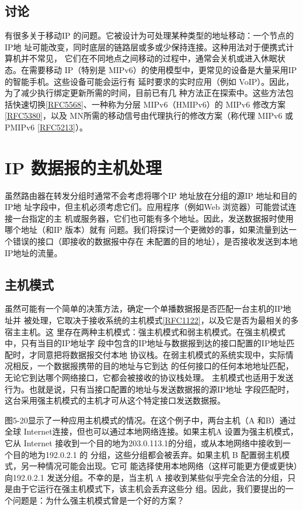 \subsection{讨论}
有很多关于移动IP 的问题。它被设计为可处理某种类型的地址移动：一个节点的IP地
址可能改变，同时底层的链路层或多或少保持连接。这种用法对于便携式计算机并不常见，
它们在不同地点之间移动的过程中，通常会关机或进入休眠状态。在需要移动 IP（特别是
MIPv6）的使用模型中，更常见的设备是大量采用IP的智能手机。这些设备可能会运行有
延时要求的实时应用（例如 VoIP）。因此，为了减少执行绑定更新所需的时间，目前已有几
种方法正在探索中。这些方法包括快速切换\href{https://www.rfc-editor.org/rfc/rfc5568}{[RFC5568]}、一种称为分层
MIPv6（HMIPv6）的
MIPv6 修改方案\href{https://www.rfc-editor.org/rfc/rfc5380}{[RFC5380]}，以及
MN所需的移动信号由代理执行的修改方案（称代理
MIPv6 或 PMIPv6 \href{https://www.rfc-editor.org/rfc/rfc5213}{[RFC5213]}）。

\section{IP 数据报的主机处理}
虽然路由器在转发分组时通常不会考虑将哪个IP 地址放在分组的源IP 地址和目的IP地
址字段中，但主机必须考虑它们。应用程序（例如Web 浏览器）可能尝试连接一台指定的主
机或服务器，它们也可能有多个地址。因此，发送数据报时使用哪个地址（和IP 版本）就有
问题。我们将探讨一个更微妙的事，如果流量到达一个错误的接口（即接收的数据报中存在
未配置的目的地址），是否接收发送到本地IP地址的流量。

\subsection{主机模式}

虽然可能有一个简单的决策方法，确定一个单播数据报是否匹配一台主机的IP地址并
被处理，它取决于接收系统的主机模式\href{https://www.rfc-editor.org/rfc/rfc1122}{[RFC1122]}，以及它是否为最相关的多宿主主机。这
里存在两种主机模式：强主机模式和弱主机模式。在强主机模式中，只有当目的IP地址字
段中包含的IP地址与数据报到达的接口配置的IP地址匹配时，才同意把将数据报交付本地
协议栈。在弱主机模式的系统实现中，实际情况相反，一个数据报携带的目的地址与它到达
的任何接口的任何本地地址匹配，无论它到达哪个网络接口，它都会被接收的协议栈处理。
主机模式也适用于发送行为。也就是说，只有当接口配置的地址与发送数据报的源IP地址
字段匹配时，这台采用强主机模式的主机才可从这个特定接口发送数据报。

图5-20显示了一种应用主机模式的情况。在这个例子中，两台主机（A 和B）通过全球
Internet连接，但也可以通过本地网络连接。如果主机A 设置为强主机模式，它从 Internet
接收到一个目的地为203.0.113.1的分组，或从本地网络中接收到一个目的地为192.0.2.1 的
分组，这些分组都会被丢弃。如果主机 B 配置弱主机模式，另一种情况可能会出现。它可
能选择使用本地网络（这样可能更方便或更快）向192.0.2.1 发送分组。不幸的是，当主机 A
接收到某些似乎完全合法的分组，只是由于它运行在强主机模式下，该主机会丢弃这些分
组。因此，我们要提出的一个问题是：为什么强主机模式曾是一个好的方案？

